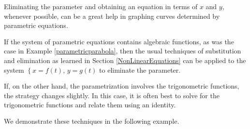 \documentclass{ximera}
\begin{document}
 

Eliminating the parameter and obtaining an equation in terms of $x$ and $y$, whenever possible, can be a great help in graphing curves determined by parametric equations.

 

 If the system of parametric equations contains algebraic functions, as was the case in  Example \ref{parametricparabola}, then the usual techniques of substitution and elimination as learned  in Section \ref{NonLinearEquations} can be applied to the system $\left\{ x = f(t), \, y = g(t) \right.$ to eliminate the parameter.  
 
  
 
 If, on the other hand, the parametrization involves the trigonometric functions, the strategy changes slightly.  In this case, it is often best to solve for the trigonometric functions and relate them using an identity.  
 
  
 
 We demonstrate these techniques in the following example.
\end{document}
